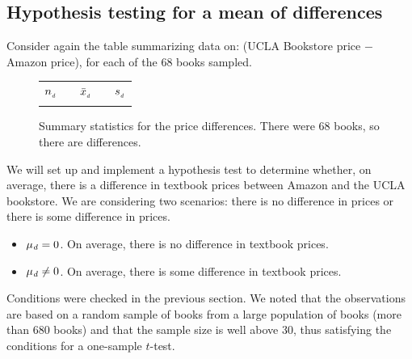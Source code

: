 \subsection{Hypothesis testing for a mean of differences}

Consider again the table summarizing data on: (UCLA Bookstore price $-$ Amazon price), for each of the 68 books sampled.

\begin{figure}[hh]
\centering
\begin{tabular}{ccccc}
\hline
$n_{_{\text{\emph{d}}}}$	&\hspace{3mm}& $\bar{x}_{_{\text{\emph{d}}}}$	&\hspace{3mm}& $s_{_{\text{\emph{d}}}}$ \vspace{1mm}\\
\uclabookN{}  && \uclabookM{}  && \uclabookSD{} \\
\hline
\end{tabular}
\caption{Summary statistics for the price differences.
    There were 68 books, so there are \uclabookN{}
    differences.}
\label{textbooksSummaryStats1}
\end{figure}

We will set up and implement a hypothesis test to determine whether, on average, there is a difference in textbook prices between Amazon and the UCLA bookstore.
\label{htForDiffInUCLAAndAmazonTextbookPrices}
We are considering two scenarios: there is no difference in prices or there is some difference in prices.
\begin{itemize}
\setlength{\itemsep}{0mm}
\item[$H_0$:] $\mu_{\text{\emph{d}}}=0$. On average, there is no difference in textbook prices.
\item[$H_A$:] $\mu_{\text{\emph{d}}} \neq 0$. On average, there is some difference in textbook prices.
\end{itemize}

\newpage
Conditions were checked in the previous section.  We noted that the observations are based on a random sample of books from a large population of books (more than 680 books) and that the sample size is well above 30, thus satisfying the conditions for a one-sample $t$-test.

